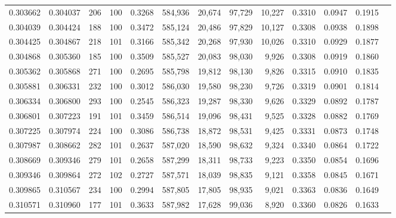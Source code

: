 \begin{tabular}{rrrrrrrrrrrrr}
0.303662 & 0.304037 &   206 & 100 &                                     0.3268 & 584,936 &  20,674 &  97,729 &  10,227 & 0.3310 & 0.0947 & 0.1915 \\
0.304039 & 0.304424 &   188 & 100 &                                     0.3472 & 585,124 &  20,486 &  97,829 &  10,127 & 0.3308 & 0.0938 & 0.1898 \\
0.304425 & 0.304867 &   218 & 101 &                                     0.3166 & 585,342 &  20,268 &  97,930 &  10,026 & 0.3310 & 0.0929 & 0.1877 \\
0.304868 & 0.305360 &   185 & 100 &                                     0.3509 & 585,527 &  20,083 &  98,030 &   9,926 & 0.3308 & 0.0919 & 0.1860 \\
0.305362 & 0.305868 &   271 & 100 &                                     0.2695 & 585,798 &  19,812 &  98,130 &   9,826 & 0.3315 & 0.0910 & 0.1835 \\
0.305881 & 0.306331 &   232 & 100 &                                     0.3012 & 586,030 &  19,580 &  98,230 &   9,726 & 0.3319 & 0.0901 & 0.1814 \\
0.306334 & 0.306800 &   293 & 100 &                                     0.2545 & 586,323 &  19,287 &  98,330 &   9,626 & 0.3329 & 0.0892 & 0.1787 \\
0.306801 & 0.307223 &   191 & 101 &                                     0.3459 & 586,514 &  19,096 &  98,431 &   9,525 & 0.3328 & 0.0882 & 0.1769 \\
0.307225 & 0.307974 &   224 & 100 &                                     0.3086 & 586,738 &  18,872 &  98,531 &   9,425 & 0.3331 & 0.0873 & 0.1748 \\
0.307987 & 0.308662 &   282 & 101 &                                     0.2637 & 587,020 &  18,590 &  98,632 &   9,324 & 0.3340 & 0.0864 & 0.1722 \\
0.308669 & 0.309346 &   279 & 101 &                                     0.2658 & 587,299 &  18,311 &  98,733 &   9,223 & 0.3350 & 0.0854 & 0.1696 \\
0.309346 & 0.309864 &   272 & 102 &                                     0.2727 & 587,571 &  18,039 &  98,835 &   9,121 & 0.3358 & 0.0845 & 0.1671 \\
0.309865 & 0.310567 &   234 & 100 &                                     0.2994 & 587,805 &  17,805 &  98,935 &   9,021 & 0.3363 & 0.0836 & 0.1649 \\
0.310571 & 0.310960 &   177 & 101 &                                     0.3633 & 587,982 &  17,628 &  99,036 &   8,920 & 0.3360 & 0.0826 & 0.1633 \\

\end{tabular}
